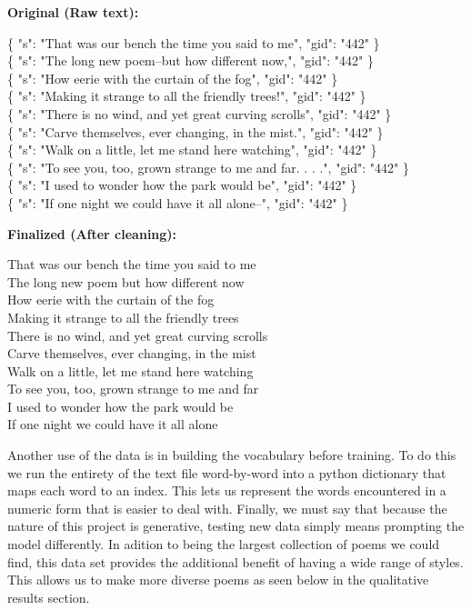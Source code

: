 \documentclass{article} %
\begin{document}
\begin{multicols}{2}

  \textbf{Original (Raw text):} \par
\{ "s": "That was our bench the time you said to me", "gid": "442" \} \\
\{ "s": "The long new poem--but how different now,", "gid": "442" \} \\
\{ "s": "How eerie with the curtain of the fog", "gid": "442" \} \\
\{ "s": "Making it strange to all the friendly trees!", "gid": "442" \} \\
\{ "s": "There is no wind, and yet great curving scrolls", "gid": "442" \} \\
\{ "s": "Carve themselves, ever changing, in the mist.", "gid": "442" \} \\
\{ "s": "Walk on a little, let me stand here watching", "gid": "442" \} \\
\{ "s": "To see you, too, grown strange to me and far. . . .", "gid": "442" \} \\
\{ "s": "I used to wonder how the park would be", "gid": "442" \} \\
\{ "s": "If one night we could have it all alone--", "gid": "442" \} \\

  \columnbreak

  \raggedleft
  \textbf{Finalized (After cleaning):} \par

  \raggedleft
That was our bench the time you said to me \\
The long new poem but how different now \\
How eerie with the curtain of the fog \\
Making it strange to all the friendly trees \\
There is no wind, and yet great curving scrolls \\
Carve themselves, ever changing, in the mist \\
Walk on a little, let me stand here watching \\
To see you, too, grown strange to me and far \\
I used to wonder how the park would be \\
If one night we could have it all alone


\end{multicols}

Another use of the data is in building the vocabulary before training.
To do this we run the entirety of the text file word-by-word into a python dictionary that maps each word to an index.
This lets us represent the words encountered in a numeric form that is easier to deal with.
Finally, we must say that because the nature of this project is generative,
testing new data simply means prompting the model differently.
In adition to being the largest collection of poems we could find,
this data set provides the additional benefit of having a wide range of styles.
This allows us to make more diverse poems as seen below in the qualitative results section.
\end{document}
